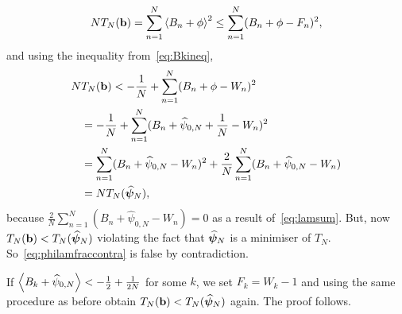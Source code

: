 \documentclass[journal]{IEEEtran}
\begin{document}
\begin{IEEEproof}
\[
N T_N(\mathbf{b}) = \sum_{n=1}^N \left\langle B_n + \phi  \right\rangle^2 \leq  \sum_{n=1}^N (B_n + \phi  - F_n)^2, 
\]
and using the inequality from~\eqref{eq:Bkineq},
\begin{align*}
N &T_N(\mathbf{b}) < - \frac{1}{N} + \sum_{n=1}^N (B_n + \phi  - W_n)^2 \\
&= - \frac{1}{N} + \sum_{n=1}^N (B_n + \widehat{\psi}_{0,N} + \frac{1}{N}  - W_n)^2 \\
&= \sum_{n=1}^N (B_n + \widehat{\psi}_{0,N}  - W_n)^2 +  \frac{2}{N}\sum_{n=1}^N (B_n + \widehat{\psi}_{0,N}  - W_n)\\
&= N T_N(\widehat{\boldsymbol{\psi}}_N),
\end{align*}
because $\frac{2}{N}\sum_{n=1}^N (B_n + \widehat{\psi}_{0,N}  - W_n) = 0$ as a result of~\eqref{eq:lamsum}.  But, now $T_N(\mathbf{b}) < T_N(\widehat{\boldsymbol{\psi}}_N)$ violating the fact that $\widehat{\boldsymbol{\psi}}_N$ is a minimiser of $T_N$.  So~\eqref{eq:philamfraccontra} is false by contradiction.

If $\left\langle B_k + \widehat{\psi}_{0,N} \right\rangle < -\frac{1}{2} + \frac{1}{2N}$ for some $k$, we set $F_k = W_k - 1$ and using the same procedure as before obtain $T_N(\mathbf{b}) < T_N(\widehat{\boldsymbol{\psi}}_N)$ again.  The proof follows.
\end{IEEEproof}
\end{document}
